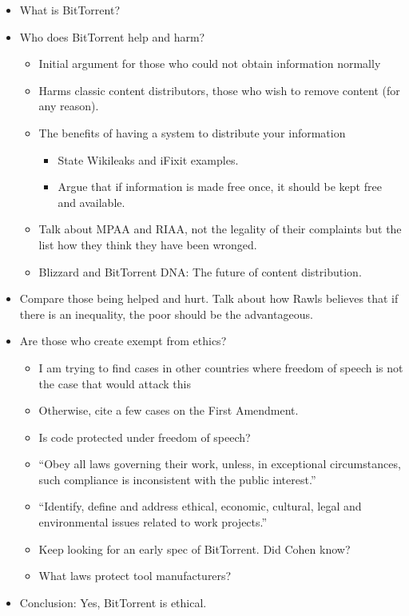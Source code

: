 \documentclass[11pt]{article}
\begin{document}
\begin{itemize}
\item What is BitTorrent?
\item Who does BitTorrent help and harm?
\begin{itemize}
   \item Initial argument for those who could not obtain information normally
   \item Harms classic content distributors, those who wish to remove content (for any reason).
   \item The benefits of having a system to distribute your information
   \begin{itemize}
      \item State Wikileaks and iFixit examples.
      \item Argue that if information is made free once, it should be kept free and available.
   \end{itemize}
   \item Talk about MPAA and RIAA, not the legality of their complaints but the list how they think they have been wronged.
   \item Blizzard and BitTorrent DNA: The future of content distribution.
\end{itemize}

\item Compare those being helped and hurt. Talk about how Rawls believes that if there is an inequality, the poor should be the advantageous.

\item Are those who create exempt from ethics?
\begin{itemize}
   \item I am trying to find cases in other countries where freedom of speech is not the case that would attack this
   \item Otherwise, cite a few cases on the First Amendment.
   \item Is code protected under freedom of speech?
   \item ``Obey all laws governing their work, unless, in exceptional circumstances, such compliance is inconsistent with the public interest.'' \cite[6.06]{secode}
   \item ``Identify, define and address ethical, economic, cultural, legal and environmental issues related to work projects.'' \cite[3.03]{secode}
   \item Keep looking for an early spec of BitTorrent. Did Cohen know?
   \item What laws protect tool manufacturers?
\end{itemize}

\item Conclusion: Yes, BitTorrent is ethical.
\end{itemize}


\end{document}
